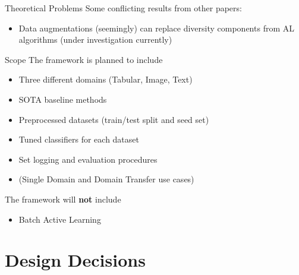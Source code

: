 \documentclass[aspectratio=169, 11pt, invertlogo]{ismll-slides}
\begin{document}

\begin{frame}[fragile]{Theoretical Problems}
	Some conflicting results from other papers:
	\begin{itemize}
		\item Data augmentations (seemingly) can replace diversity components from AL algorithms (under investigation currently)
	\end{itemize}
\end{frame}


\begin{frame}[fragile]{Scope}
	The framework is planned to include
	\begin{itemize}
		\item Three different domains (Tabular, Image, Text)
		\item SOTA baseline methods 
		\item Preprocessed datasets (train/test split and seed set)
		\item Tuned classifiers for each dataset
		\item Set logging and evaluation procedures
		\item (Single Domain and Domain Transfer use cases)
	\end{itemize}
	The framework will \textbf{not} include
	\begin{itemize}
		\item Batch Active Learning
	\end{itemize}
\end{frame}


\section{Design Decisions}

\end{document}
